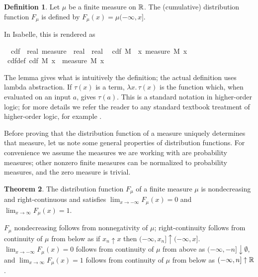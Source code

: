 \documentclass{article}
\theoremstyle{definition}
\newtheorem{theorem}{Theorem}[section]
\newtheorem{definition}[theorem]{Definition}
\begin{document}
\begin{definition}
Let $\mu$ be a finite measure on $\mathbb{R}$. The (cumulative) distribution function $F_\mu$ is defined by $F_\mu(x) = \mu (-\infty, x]$.
\end{definition}

In Isabelle, this is rendered as

\medskip

\begin{isabellebody}
\isamarkupfalse%
\isanewline
\ \ cdf\ {\isacharcolon}{\isacharcolon}\ {\isachardoublequoteopen}real\ measure\ {\isasymRightarrow}\ real\ {\isasymRightarrow}\ real{\isachardoublequoteclose}\isanewline
{}\isanewline
\ \ {\isachardoublequoteopen}cdf\ M\ {\isasymequiv}\ {\isasymlambda}x{\isachardot}\ measure\ M\ {\isacharbraceleft}{\isachardot}{\isachardot}x{\isacharbraceright}{\isachardoublequoteclose}\isanewline
\isanewline
{}\isamarkupfalse%
\ cdf{\isacharunderscore}def{}{\isacharcolon}\ {\isachardoublequoteopen}cdf\ M\ x\ {\isacharequal}\ measure\ M\ {\isacharbraceleft}{\isachardot}{\isachardot}x{\isacharbraceright}{\isachardoublequoteclose}%
\end{isabellebody}

\medskip

The lemma gives what is intuitively the definition; the actual definition uses lambda abstraction. If $\tau(x)$ is a term, $\lambda x. \, \tau(x)$ is the function which, when evaluated on an input $a$, gives $\tau(a)$. This is a standard notation in higher-order logic; for more details we refer the reader to any standard textbook treatment of higher-order logic, for example \cite{andrews}.

Before proving that the distribution function of a measure uniquely determines that measure, let us note some general properties of distribution functions. For convenience we assume the measures we are working with are probability measures; other nonzero finite measures can be normalized to probability measures, and the zero measure is trivial.

\begin{theorem}
The distribution function $F_\mu$ of a finite measure $\mu$ is nondecreasing and right-continuous and satisfies $\lim_{x \rightarrow -\infty} F_\mu(x) = 0$ and $\lim_{x \rightarrow \infty} F_\mu(x) = 1$.
\end{theorem}

$F_\mu$ nondecreasing follows from nonnegativity of $\mu$; right-continuity follows from continuity of $\mu$ from below as if $x_n \uparrow x$ then $(-\infty
, x_n] \uparrow (-\infty, x]$. $\lim_{x \rightarrow -\infty} F_\mu(x) = 0$ follows from continuity of $\mu$ from above as $(-\infty, -n] \downarrow \emptyset$, and $\lim_{x \rightarrow \infty} F_\mu(x) = 1$ follows from continuity of $\mu$ from below as $(-\infty, n] \uparrow \mathbb{R}$.
\end{document}
